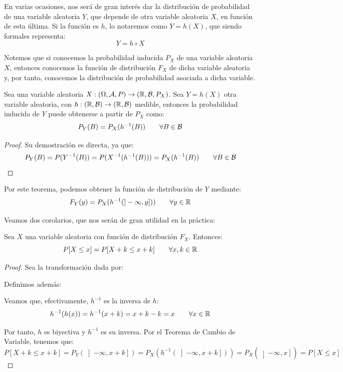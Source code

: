 En varias ocasiones, nos será de gran interés dar la distribución de probabilidad de una variable aleatoria $Y$, que depende de otra variable aleatoria $X$, en función de esta última. Si la función es $h$, lo notaremos como $Y=h(X)$, que siendo formales representa:
\begin{equation*}
    Y=h\circ X
\end{equation*}

Notemos que si conocemos la probabilidad inducida $P_X$ de una variable aleatoria $X$, entonces conocemos la función de distribución $F_X$ de dicha variable aleatoria y, por tanto, conocemos la distribución de probabilidad asociada a dicha variable.

\begin{teo}
  Sea una variable aleatoria $X: (\Omega, \mathcal{A}, P) \rightarrow (\mathbb R, \mathcal{B}, P_X)$.
  Sea $Y=h(X)$ otra variable aleatoria, con $h:(\mathbb R, \mathcal{B}) \rightarrow (\mathbb R, \mathcal{B})$ medible, entonces la probabilidad inducida de $Y$ puede obtenerse a partir de $P_X$ como:
  $$P_Y(B) = P_X(h^{-1}(B)) \qquad \forall B \in \mathcal{B}$$
\end{teo}
\begin{proof} Su demostración es directa, ya que:
  $$P_Y(B) = P(Y^{-1}(B)) = P(X^{-1}(h^{-1}(B))) = P_X(h^{-1}(B)) \qquad \forall B \in \mathcal{B}$$
\end{proof}

Por este teorema, podemos obtener la función de distribución de $Y$ mediante:
$$F_Y(y) = P_X(h^{-1}(]-\infty, y])) \qquad \forall y\in \mathbb R$$

Veamos dos corolarios, que nos serán de gran utilidad en la práctica:
\begin{coro}
    Sea $X$ una variable aleatoria con función de distribución $F_X$. Entonces:
    \begin{equation*}
        P[X\leq x] = P[X+k\leq x+k]\qquad \forall x,k \in \mathbb{R}
    \end{equation*}
\end{coro}
\begin{proof}
    Sea la transformación dada por:
    
    Definimos además:

    Veamos que, efectivamente, $h^{-1}$ es la inversa de $h$:
    $$h^{-1}(h(x)) = h^{-1}(x+k) = x+k-k = x\qquad \forall x \in \mathbb R$$

    Por tanto, $h$ es biyectiva y $h^{-1}$ es su inversa. Por el Teorema de Cambio de Variable, tenemos que:
    $$P[X+k\leq x+k] = P_Y(\left]-\infty, x+k\right]) = P_X(h^{-1}(\left]-\infty, x+k\right])) = P_X(\left]-\infty, x\right]) = P[X\leq x]$$
\end{proof}

